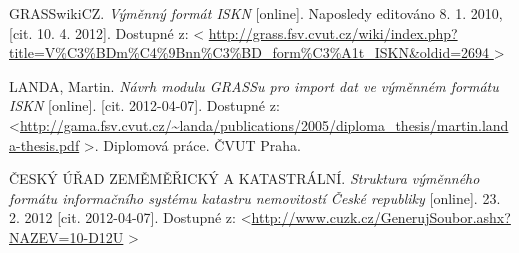 \documentclass[a4paper,10pt]{article}
\begin{document}
\begin{thebibliography}{9}
GRASSwikiCZ. \textit{Výměnný formát ISKN} [online].
Naposledy editováno 8. 1. 2010, [cit. 10. 4. 2012]. Dostupné z: \textless
\url{
    http://grass.fsv.cvut.cz/wiki/index.php?title=V%
    } \textgreater

LANDA, Martin. \emph{Návrh modulu GRASSu pro import dat ve výměnném formátu ISKN} [online]. [cit. 2012-04-07]. Dostupné z: \textless \url{http://gama.fsv.cvut.cz/~landa/publications/2005/diploma_thesis/martin.landa-thesis.pdf} \textgreater. Diplomová práce. ČVUT Praha.

ČESKÝ ÚŘAD ZEMĚMĚŘICKÝ A KATASTRÁLNÍ. \emph{Struktura výměnného formátu informačního systému katastru nemovitostí České republiky} [online]. 23. 2. 2012 [cit. 2012-04-07]. Dostupné z: \textless \url{http://www.cuzk.cz/GenerujSoubor.ashx?NAZEV=10-D12U} \textgreater
    
    \end{thebibliography}
\end{document}
